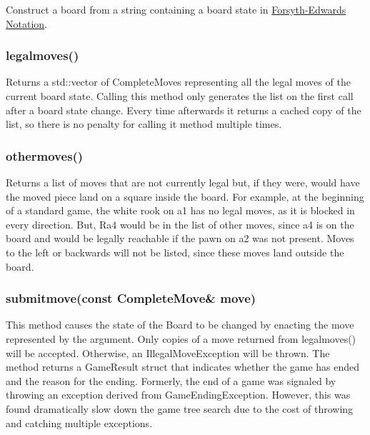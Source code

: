 \documentclass[letterpaper]{article}
\newcommand{\code}[1]{#1}
\renewcommand\_{\textunderscore\allowbreak}
\begin{document}
Construct a board from a string containing a board state in \href{https://en.wikipedia.org/wiki/Forsyth\%E2\%80\%93Edwards\_Notation}{Forsyth-Edwards Notation}.

\subsubsection{legal\_moves()}

Returns a \code{std::vector} of \code{Complete\_Move}s representing all the legal moves of the current board state. Calling this method only generates the list on the first call after a board state change. Every time afterwards it returns a cached copy of the list, so there is no penalty for calling it method multiple times.

\subsubsection{other\_moves()}

Returns a list of moves that are not currently legal but, if they were, would have the moved piece land on a square inside the board. For example, at the beginning of a standard game, the white rook on a1 has no legal moves, as it is blocked in every direction. But, Ra4 would be in the list of other moves, since a4 is on the board and would be legally reachable if the pawn on a2 was not present. Moves to the left or backwards will not be listed, since these moves land outside the board.

\subsubsection[submit\_move]{submit\_move(const Complete\_Move\& move)}
\label{board-submit-move-section}

This method causes the state of the \code{Board} to be changed by enacting the move represented by the argument. Only copies of a move returned from \code{legal\_moves()} will be accepted. Otherwise, an \code{Illegal\_Move\_Exception} will be thrown. The method returns a \code{Game\_Result} \code{struct} that indicates whether the game has ended and the reason for the ending. Formerly, the end of a game was signaled by throwing an exception derived from \code{Game\_Ending\_Exception}. However, this was found dramatically slow down the game tree search due to the cost of throwing and catching multiple exceptions.
\end{document}
